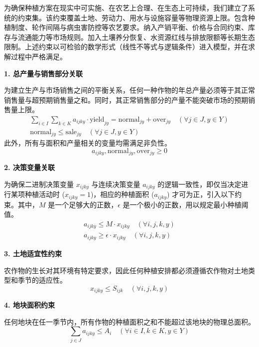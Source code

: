 为确保种植方案在现实中可实施、在农艺上合理、在生态上可持续，我们建立了系统的约束集。该约束覆盖土地、劳动力、用水与设施容量等物理资源上限。包含种植制度、轮作间隔与病虫害防控等农艺要求。纳入产销平衡、价格与合同约束、库存与流通能力等市场规则。加入土壤养分恢复、水资源红线与排放限额等长期生态限制。上述约束以可检验的数学形式（线性不等式与逻辑条件）进入模型，并在求解过程中严格满足。

\textbf{1. 总产量与销售部分关联}

为建立生产与市场销售之间的平衡关系，任何一种作物的年总产量必须等于其正常销售量与超预期销售量之和。同时，其正常销售部分的产量不能突破市场的预期销售量上限。
\begin{gather}
\sum_{i \in I} \sum_{k \in K} a_{ijky} \cdot \text{yield}_{jy} = \text{normal}_{jy} + \text{over}_{jy} \quad (\forall j \in J, y \in Y) \label{eq:yield_balance} \\
\text{normal}_{jy} \le \text{sale}_{jy} \quad (\forall j \in J, y \in Y) \label{eq:normal_sale_limit}
\end{gather}
此外，所有与面积和产量相关的变量均需满足非负性。
\begin{equation}
a_{ijky}, \text{normal}_{jy}, \text{over}_{jy} \ge 0 \label{eq:non_negativity}
\end{equation}

\textbf{2. 决策变量关联}

为确保二进制决策变量 $x_{ijky}$ 与连续决策变量 $a_{ijky}$ 的逻辑一致性，即仅当决定进行某项种植活动时 ($x_{ijky}=1$)，相应的种植面积 ($a_{ijky}$) 才可为正，引入以下约束。其中，$M$ 是一个足够大的正数，$\epsilon$ 是一个极小的正数，用以规定最小种植阈值。
\begin{gather}
a_{ijky} \le M \cdot x_{ijky} \quad (\forall i, j, k, y) \label{eq:big_m} \\
a_{ijky} \ge \epsilon \cdot x_{ijky} \quad (\forall i, j, k, y) \label{eq:min_area}
\end{gather}

\textbf{3. 土地适宜性约束}

农作物的生长对其环境有特定要求，因此任何种植安排都必须遵循农作物对土地类型和季节的适应性。
\begin{equation}
x_{ijky} \le S_{ijk} \quad (\forall i, j, k, y) \label{eq:suitability}
\end{equation}

\textbf{4. 地块面积约束}

任何地块在任一季节内，所有作物的种植面积之和不能超过该地块的物理总面积。
\begin{equation}
\sum_{j \in J} a_{ijky} \le A_i \quad (\forall i \in I, k \in K, y \in Y) \label{eq:area_limit}
\end{equation}

